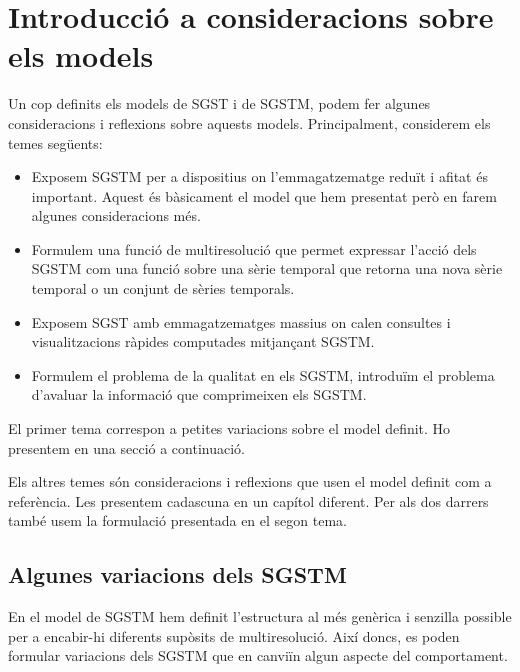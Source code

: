 \chapter{Introducció a consideracions sobre els models}
\label{sec:variacions}

Un cop definits els models de \gls{SGST} i de \gls{SGSTM}, podem
fer algunes consideracions i reflexions sobre aquests models.
Principalment, considerem els temes següents:

\begin{itemize}
\item Exposem \gls{SGSTM} per a dispositius on l'emmagatzematge reduït
  i afitat és important. Aquest és bàsicament el model que hem
  presentat però en farem algunes consideracions més.

\item Formulem una funció de multiresolució que permet expressar
  l'acció dels \gls{SGSTM} com una funció sobre una sèrie temporal que
  retorna una nova sèrie temporal o un conjunt de sèries temporals.

\item Exposem \gls{SGST} amb emmagatzematges massius on calen
  consultes i visualitzacions ràpides computades mitjançant
  \gls{SGSTM}.

\item Formulem el problema de la qualitat en els \gls{SGSTM},
  introduïm el problema d'avaluar la informació que comprimeixen els
  \gls{SGSTM}.

\end{itemize}


El primer tema correspon a petites variacions sobre el model
definit. Ho presentem en una secció a continuació.

Els altres temes són consideracions i reflexions que usen el model
definit com a referència. Les presentem cadascuna en un capítol
diferent. Per als dos darrers també usem la formulació presentada en
el segon tema.






\section{Algunes variacions dels SGSTM}
\label{sec:multiresolucion:variacionsbuffer}

En el model de \gls{SGSTM} hem definit l'estructura al més genèrica i
senzilla possible per a encabir-hi diferents supòsits de
multiresolució. Així doncs, es poden formular variacions dels
\gls{SGSTM} que en canviïn algun aspecte del comportament.


